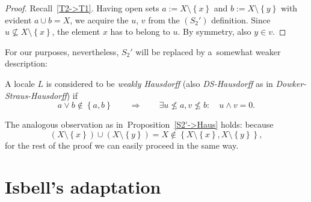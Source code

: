 \begin{proof}
  Recall~\ref{T2->T1}.
  Having open sets $a := X \setminus \left\{x\right\}$ and $b := X \setminus
  \left\{y\right\}$ with evident $a \cup b = X$, we acquire the $u$, $v$ from
  the $(S_2')$ definition.
  Since $u\not\subseteq X\setminus \left\{x\right\}$, the element $x$ has to
  belong to $u$.
  By symmetry, also $y \in v$.
\end{proof}

For our purposes, nevertheless, $S_2'$ will be replaced by a~somewhat weaker
description:

\begin{framed}
  \begin{df}[DS-Haus]
    A locale $L$ is considered to be \emph{weakly Hausdorff\/} (also
    \emph{DS-Hausdorff} as in \emph{Dowker-Straus-Hausdorff}) if
    \[
      a \vee b \not\in \left\{a, b\right\} \qquad \Rightarrow \qquad \exists
      u\not\leq a, v\not\leq b: \quad u \wedge v = 0.
    \]
  \end{df}
\end{framed}

\begin{rem}
  The analogous observation as in~Proposition~\ref{S2'->Haus} holds:
  because
  \[
    (X \setminus \left\{x\right\}) \cup (X \setminus \left\{y\right\}) = X
    \not\in \left\{X \setminus \left\{x\right\}, X \setminus \left\{y\right\}
    \right\},
  \]
  for the rest of the proof we can easily proceed in the same way.
\end{rem}

\section{Isbell's adaptation}
